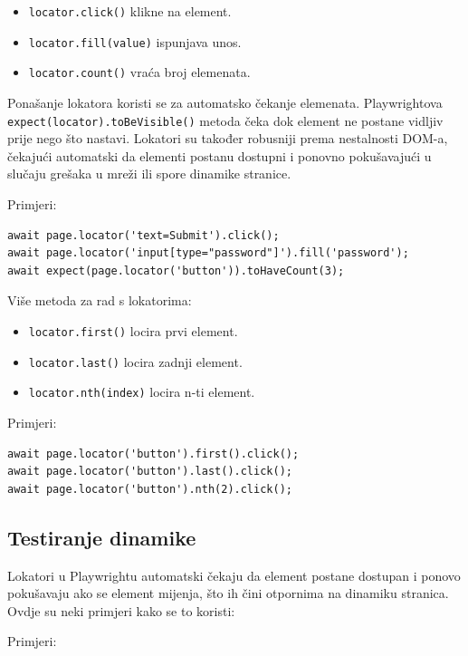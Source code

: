 \begin{itemize}
 
  \item \texttt{locator.click()} klikne na element.
  \item \texttt{locator.fill(value)} ispunjava unos.
  \item \texttt{locator.count()} vraća broj elemenata.
\end{itemize}

Ponašanje lokatora koristi se za automatsko čekanje elemenata.
Playwrightova \texttt{expect(locator).toBeVisible()} metoda čeka dok element ne postane vidljiv prije nego što nastavi.
Lokatori su također robusniji prema nestalnosti DOM-a, čekajući automatski da elementi postanu dostupni i ponovno pokušavajući u slučaju grešaka u mreži ili spore dinamike stranice.

Primjeri:

\begin{verbatim}
await page.locator('text=Submit').click();
await page.locator('input[type="password"]').fill('password');
await expect(page.locator('button')).toHaveCount(3);
\end{verbatim}

Više metoda za rad s lokatorima:
\begin{itemize}
  
  \item  \texttt{locator.first()} locira prvi element.
  \item  \texttt{locator.last()} locira zadnji element.
  \item  \texttt{locator.nth(index)} locira n-ti element.
\end{itemize}

Primjeri:

\begin{verbatim}
await page.locator('button').first().click();
await page.locator('button').last().click();
await page.locator('button').nth(2).click();
\end{verbatim}

\subsection*{Testiranje dinamike}

Lokatori u Playwrightu automatski čekaju da element postane dostupan i ponovo pokušavaju ako se element mijenja, što ih čini otpornima na dinamiku stranica.
Ovdje su neki primjeri kako se to koristi:

Primjeri:

